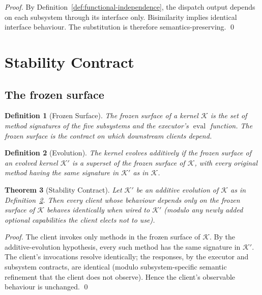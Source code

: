\documentclass[twocolumn,11pt,a4paper]{article}
\newtheorem{theorem}{Theorem}[section]
\newtheorem{definition}[theorem]{Definition}
\DeclareMathOperator{\eval}{eval}
\newcommand{\Kernel}{\mathcal{K}}
\begin{document}
\begin{proof}
By Definition~\ref{def:functional-independence}, the dispatch output depends on each subsystem through its interface only. Bisimilarity implies identical interface behaviour. The substitution is therefore semantics-preserving. \qed
\end{proof}

\section{Stability Contract}
\label{sec:stability}

\subsection{The frozen surface}

\begin{definition}[Frozen Surface]
\label{def:frozen}
The \emph{frozen surface} of a kernel $\Kernel$ is the set of method signatures of the five subsystems and the executor's $\eval$ function. The frozen surface is the contract on which downstream clients depend.
\end{definition}

\begin{definition}[Evolution]
\label{def:evolution}
The kernel \emph{evolves additively} if the frozen surface of an evolved kernel $\Kernel'$ is a superset of the frozen surface of $\Kernel$, with every original method having the same signature in $\Kernel'$ as in $\Kernel$.
\end{definition}

\begin{theorem}[Stability Contract]
\label{thm:stability}
Let $\Kernel' $ be an additive evolution of $\Kernel$ as in Definition~\ref{def:evolution}. Then every client whose behaviour depends only on the frozen surface of $\Kernel$ behaves identically when wired to $\Kernel'$ (modulo any newly added optional capabilities the client elects not to use).
\end{theorem}

\begin{proof}
The client invokes only methods in the frozen surface of $\Kernel$. By the additive-evolution hypothesis, every such method has the same signature in $\Kernel'$. The client's invocations resolve identically; the responses, by the executor and subsystem contracts, are identical (modulo subsystem-specific semantic refinement that the client does not observe). Hence the client's observable behaviour is unchanged. \qed
\end{proof}
\end{document}
